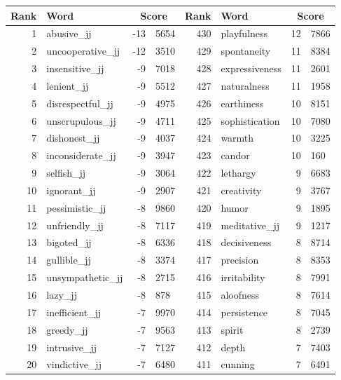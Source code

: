 \begin{table}[tbp]
    \begin{tabular}{| rlr@{.}l | rlr@{.}l |}
    \hline
    \textbf{Rank} & \textbf{Word} & \multicolumn{2}{c|}{\textbf{Score}} & \textbf{Rank} & \textbf{Word} & \multicolumn{2}{c|}{\textbf{Score}} \\
    \hline
    1 & abusive\_jj & -13 & 5654    &    430 & playfulness & 12 & 7866 \\
    2 & uncooperative\_jj & -12 & 3510    &    429 & spontaneity & 11 & 8384 \\
    3 & insensitive\_jj & -9 & 7018    &    428 & expressiveness & 11 & 2601 \\
    4 & lenient\_jj & -9 & 5512    &    427 & naturalness & 11 & 1958 \\
    5 & disrespectful\_jj & -9 & 4975    &    426 & earthiness & 10 & 8151 \\
    6 & unscrupulous\_jj & -9 & 4711    &    425 & sophistication & 10 & 7080 \\
    7 & dishonest\_jj & -9 & 4037    &    424 & warmth & 10 & 3225 \\
    8 & inconsiderate\_jj & -9 & 3947    &    423 & candor & 10 & 160 \\
    9 & selfish\_jj & -9 & 3064    &    422 & lethargy & 9 & 6683 \\
    10 & ignorant\_jj & -9 & 2907    &    421 & creativity & 9 & 3767 \\
    11 & pessimistic\_jj & -8 & 9860    &    420 & humor & 9 & 1895 \\
    12 & unfriendly\_jj & -8 & 7117    &    419 & meditative\_jj & 9 & 1217 \\
    13 & bigoted\_jj & -8 & 6336    &    418 & decisiveness & 8 & 8714 \\
    14 & gullible\_jj & -8 & 3374    &    417 & precision & 8 & 8353 \\
    15 & unsympathetic\_jj & -8 & 2715    &    416 & irritability & 8 & 7991 \\
    16 & lazy\_jj & -8 & 878    &    415 & aloofness & 8 & 7614 \\
    17 & inefficient\_jj & -7 & 9970    &    414 & persistence & 8 & 7045 \\
    18 & greedy\_jj & -7 & 9563    &    413 & spirit & 8 & 2739 \\
    19 & intrusive\_jj & -7 & 7127    &    412 & depth & 7 & 7403 \\
    20 & vindictive\_jj & -7 & 6480    &    411 & cunning & 7 & 6491 \\

\end{tabular}
\end{table}
